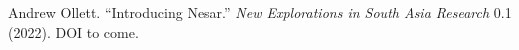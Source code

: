 Andrew Ollett. “Introducing Nesar.” \emph{New Explorations in South Asia Research} 0.1 (2022). DOI to come.